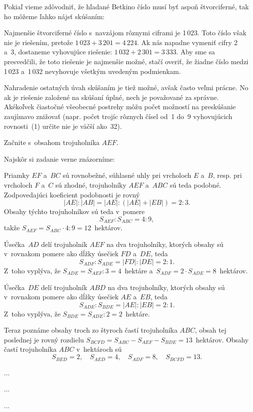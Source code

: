 {\poznamky
Pokiaľ vieme zdôvodniť, že hľadané Betkino číslo musí byť aspoň
štvorciferné, tak ho môžeme ľahko nájsť skúšaním:

Najmenšie štvorciferné číslo s~navzájom rôznymi ciframi je 1\,023.
Toto číslo však nie je riešením, pretože $1\,023+3\,201=4\,224$.
Ak nás napadne vymeniť cifry 2 a~3, dostaneme vyhovujúce riešenie:
$1\,032+2\,301=3\,333$.
Aby sme sa presvedčili, že toto riešenie je najmenšie možné, stačí overiť, že žiadne
číslo medzi 1\,023 a~1\,032 nevyhovuje všetkým uvedeným podmienkam.

\smallskip
Nahradenie ostatných úvah skúšaním je tiež možné, avšak často veľmi prácne.
No ak je riešenie založené na skúšaní úplné, nech je považované za
správne.
Akékoľvek čiastočné všeobecné postrehy môžu počet možností na preskúšanie zaujímavo
znižovať
(napr. počet trojíc rôznych čísel od~1 do~9 vyhovujúcich rovnosti~(1) určite nie je väčší ako~32).
}

{%
\napad
Začnite s~obsahom trojuholníka $AEF$.

\riesenie
Najskôr si zadanie verne znázorníme:
%


Priamky $EF$ a~$BC$ sú rovnobežné,
súhlasné uhly pri vrcholoch $E$ a~$B$, resp. pri vrcholoch $F$ a~$C$ sú zhodné,
trojuholníky $AEF$ a~$ABC$ sú teda podobné.
Zodpovedajúci koeficient podobnosti je rovný
$$
|AE|:|AB|=|AE|:(|AE|+|EB|) =2:3.
$$
Obsahy týchto trojuholníkov sú teda v~pomere
$$
S_{AEF}:S_{ABC}=4:9,
$$
takže
$S_{AEF}=S_{ABC}\cdot 4:9 =12$~hektárov.

Úsečka~$AD$ delí trojuholník $AEF$ na dva trojuholníky, ktorých obsahy sú
v~rovnakom pomere ako dĺžky úsečiek $FD$ a~$DE$, teda
$$
S_{ADF}:S_{ADE} =|FD|:|DE| =2:1.
$$
Z~toho vyplýva, že
$S_{ADE} =S_{AEF}:3 =4$~hektáre a~$S_{ADF} =2\cdot S_{ADE} =8$~hektárov.

Úsečka~$DE$ delí trojuholník $ABD$ na dva trojuholníky, ktorých obsahy sú
v~rovnakom pomere ako dĺžky úsečiek $AE$ a~$EB$, teda
$$
S_{ADE}:S_{BDE} =|AE|:|EB| =2:1.
$$
Z~toho vyplýva, že $S_{BDE} =S_{ADE}:2 =2$~hektáre.

Teraz poznáme obsahy troch zo štyroch častí trojuholníka $ABC$, obsah tej poslednej je rovný rozdielu
$S_{BCFD} =S_{ABC}-S_{AEF}-S_{BDE} =13$~hektárov.
Obsahy častí trojuholníka $ABC$ v~hektároch sú
$$
S_{BED}=2,\quad S_{AED}=4,\quad S_{ADF}=8,\quad S_{BCFD}=13.
$$
}

{%
...}

{%
...}

{%
...}

